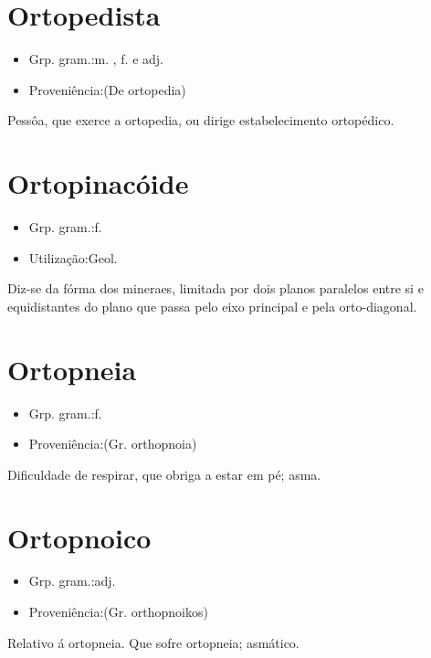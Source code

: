 \section{Ortopedista}
\begin{itemize}
\item {Grp. gram.:m. ,  f.  e  adj.}
\end{itemize}
\begin{itemize}
\item {Proveniência:(De \textunderscore ortopedia\textunderscore )}
\end{itemize}
Pessôa, que exerce a ortopedia, ou dirige estabelecimento ortopédico.
\section{Ortopinacóide}
\begin{itemize}
\item {Grp. gram.:f.}
\end{itemize}
\begin{itemize}
\item {Utilização:Geol.}
\end{itemize}
Diz-se da fórma dos mineraes, limitada por dois planos paralelos entre si e equidistantes do plano que passa pelo eixo principal e pela orto-diagonal.
\section{Ortopneia}
\begin{itemize}
\item {Grp. gram.:f.}
\end{itemize}
\begin{itemize}
\item {Proveniência:(Gr. \textunderscore orthopnoia\textunderscore )}
\end{itemize}
Dificuldade de respirar, que obriga a estar em pé; asma.
\section{Ortopnoico}
\begin{itemize}
\item {Grp. gram.:adj.}
\end{itemize}
\begin{itemize}
\item {Proveniência:(Gr. \textunderscore orthopnoikos\textunderscore )}
\end{itemize}
Relativo á ortopneia.
Que sofre ortopneia; asmático.
